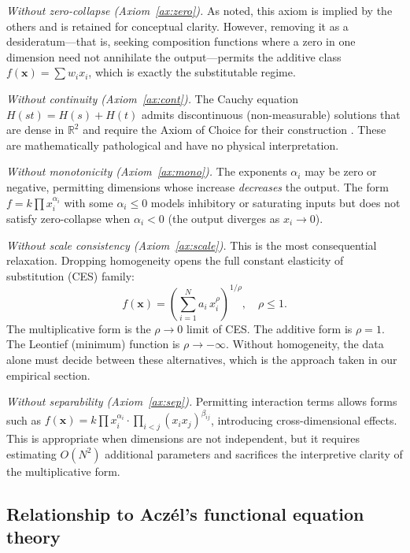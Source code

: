 \documentclass[12pt, a4paper]{article}
\theoremstyle{definition}
\theoremstyle{remark}
\newcommand{\R}{\mathbb{R}}
\begin{document}
\textit{Without zero-collapse (Axiom~\ref{ax:zero}).} As noted, this axiom is implied by the others and is retained for conceptual clarity. However, removing it as a desideratum---that is, seeking composition functions where a zero in one dimension need not annihilate the output---permits the additive class $f(\mathbf{x}) = \sum w_i x_i$, which is exactly the substitutable regime.

\textit{Without continuity (Axiom~\ref{ax:cont}).} The Cauchy equation $H(st) = H(s) + H(t)$ admits discontinuous (non-measurable) solutions that are dense in $\R^2$ and require the Axiom of Choice for their construction \cite{aczel1966}. These are mathematically pathological and have no physical interpretation.

\textit{Without monotonicity (Axiom~\ref{ax:mono}).} The exponents $\alpha_i$ may be zero or negative, permitting dimensions whose increase \textit{decreases} the output. The form $f = k \prod x_i^{\alpha_i}$ with some $\alpha_i \leq 0$ models inhibitory or saturating inputs but does not satisfy zero-collapse when $\alpha_i < 0$ (the output diverges as $x_i \to 0$).

\textit{Without scale consistency (Axiom~\ref{ax:scale}).} This is the most consequential relaxation. Dropping homogeneity opens the full constant elasticity of substitution (CES) family:
\begin{equation}\label{eq:ces}
f(\mathbf{x}) = \left(\sum_{i=1}^{N} a_i \, x_i^{\rho}\right)^{1/\rho}, \quad \rho \leq 1.
\end{equation}
The multiplicative form is the $\rho \to 0$ limit of CES. The additive form is $\rho = 1$. The Leontief (minimum) function is $\rho \to -\infty$. Without homogeneity, the data alone must decide between these alternatives, which is the approach taken in our empirical section.

\textit{Without separability (Axiom~\ref{ax:sep}).} Permitting interaction terms allows forms such as $f(\mathbf{x}) = k \prod x_i^{\alpha_i} \cdot \prod_{i < j} (x_i x_j)^{\beta_{ij}}$, introducing cross-dimensional effects. This is appropriate when dimensions are not independent, but it requires estimating $O(N^2)$ additional parameters and sacrifices the interpretive clarity of the multiplicative form.

\subsection{Relationship to Acz\'el's functional equation theory}
\end{document}
